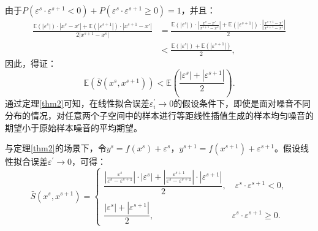 \documentclass{NauThesis}
\begin{document}
由于$P(\varepsilon^s\cdot\varepsilon^{s+1}<0)+P(\varepsilon^s\cdot\varepsilon^{s+1}\ge0)=1$，并且：
$$\begin{aligned}
    \frac{{\mathbb{E}(|\varepsilon^s|)\cdot|x^s-x'|+\mathbb{E}(|\varepsilon^{s+1}|)\cdot|x^{s+1}-x'|}}{2|x^{s+1}-x^s|}&=
    \frac{{\mathbb{E}(|\varepsilon^s|)\cdot|\frac{x^s-x'}{x^{s+1}-x^s}|+\mathbb{E}(|\varepsilon^{s+1}|)\cdot|\frac{x^{s+1}-x'}{x^{s+1}-x^s}|}}{2}\\
    &<\frac{{\mathbb{E}(|\varepsilon^s|)+\mathbb{E}(|\varepsilon^{s+1}|)}}{2},
\end{aligned}$$
因此，得证：
$$\mathbb{E}(\bar{S}(x^s,x^{s+1}))<\mathbb{E}(\frac{|\varepsilon^s|+|\varepsilon^{s+1}|}{2}).$$
\newpage
通过定理\ref{thm2}可知，在线性拟合误差$\varepsilon_i^\prime\rightarrow0$的假设条件下，即使是面对噪音不同分布的情况，对任意两个子空间中的样本进行等距线性插值生成的样本均匀噪音的期望小于原始样本噪音的平均期望。
\begin{theorem}\label{thm3}
	与定理\ref{thm2}的场景下，令$y^s=f(x^s)+\varepsilon^s$，$y^{s+1}=f(x^{s+1})+\varepsilon^{s+1}$。假设线性拟合误差$\varepsilon^\prime\rightarrow0$，可得：
    \begin{equation}\label{equ14}
        \bar{
S}(x^s,x^{s+1})= \begin{cases} 
\dfrac{|\frac{\varepsilon^s}{\varepsilon^s-\varepsilon^{s+1}}|\cdot|\varepsilon^{s}|+|\frac{\varepsilon^{s+1}}{\varepsilon^s-\varepsilon^{s+1}}|\cdot|\varepsilon^{s+1}|}{2},\quad\varepsilon^s\cdot \varepsilon^{s+1}<0,
\\
\\
\dfrac{|\varepsilon^s|+|\varepsilon^{s+1}|}{2}, \qquad\qquad\qquad\qquad\;\;\;\;\varepsilon^s\cdot \varepsilon^{s+1}\ge0.
\end{cases}    
    \end{equation}
\end{theorem}
\end{document}
